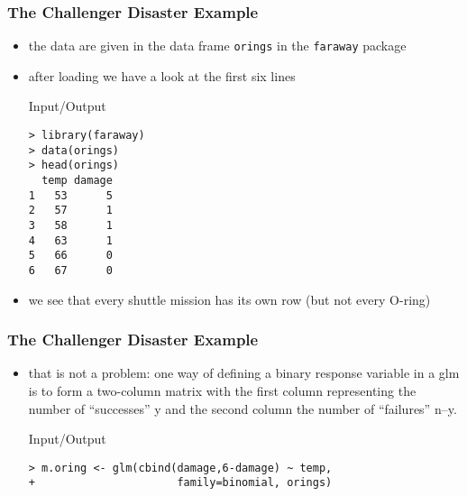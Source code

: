 \begin{frame}[fragile]\frametitle{The Challenger Disaster Example}
\begin{itemize}
\item the data are given in the data frame \texttt{orings} in the \texttt{faraway} package
\item after loading we have a look at the first six lines
  \begin{exampleblock}{Input/Output}\small
\begin{verbatim}
> library(faraway)
> data(orings)
> head(orings)
  temp damage
1   53      5
2   57      1
3   58      1
4   63      1
5   66      0
6   67      0
\end{verbatim}
  \end{exampleblock}

\item we see that every shuttle mission has its own row (but not every O-ring)
\end{itemize}
\end{frame}

\begin{frame}[fragile]\frametitle{The Challenger Disaster Example}
\begin{itemize}
\item that is not a problem: one way of defining a binary response variable in a glm is to form a two-column matrix with the first
column representing the number of “successes” y and the second column the number of “failures” n–y.
\begin{exampleblock}{Input/Output}\small
\begin{verbatim}
> m.oring <- glm(cbind(damage,6-damage) ~ temp,
+                      family=binomial, orings)
\end{verbatim}
\end{exampleblock}

\normalsize
\end{itemize}
\end{frame}


